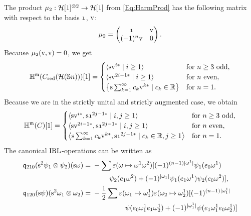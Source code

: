 \documentclass[\MainFolder/Text.tex]{subfiles}
\begin{document}
The product $\mu_2: \mathcal{H}[1]^{\otimes 2} \rightarrow \mathcal{H}[1]$ from \eqref{Eq:HarmProd} has the following matrix with respect to the basis $\NOne$, $\mathrm{v}$:
\begin{equation*} 
 \mu_2 = \begin{pmatrix} \NOne &  \NVol \\ (-1)^n \NVol & 0 \end{pmatrix}.
\end{equation*}
Because $\mu_2(\mathrm{v}, \mathrm{v}) = 0$, we get
\begin{equation*}
\mathbb{H}^{\mathfrak{m}}(C_{\mathrm{red}}(\mathcal{H}(\mathbb{S}{n})))[1] = \begin{cases}
                        \langle \mathrm{s} \mathrm{v}^{i*} \mid i \ge 1 \rangle & \text{for }n\ge 3\text{ odd}, \\
                        \langle  \mathrm{s} \mathrm{v}^{2i-1*} \mid i\ge 1 \rangle & \text{for }n\text{ even},\\
 \bigl\{ \mathrm{s}\sum_{k=1}^\infty c_k \mathrm{v}^{k*} \mid c_k\in \mathbb{R} \bigr\} & \text{for }n=1. 
\end{cases}
\end{equation*}
Because we are in the strictly unital and strictly augmented case, we obtain
\begin{equation} \label{Eq:HIBLSn}
\HIBL^\MC(\CycC)[1] = \begin{cases}
\langle \Susp \NVol^{i*}, \Susp \NOne^{2j-1*} \mid i, j \ge 1\rangle & \text{for }n\ge 3 \text{ odd}, \\
\langle \Susp \NVol^{2 i-1*}, \Susp \NOne^{2j-1*} \mid i, j \ge 1\rangle &\text{for }n\text{ even}, \\
 \bigl\langle \Susp\sum_{k=1}^\infty c_k \NVol^{k*}, \Susp \NOne^{2j-1*}\mid c_k\in \R, j \ge 1\bigr\rangle & \text{for }n=1. 
\end{cases}
\end{equation}
The canonical $\mathrm{IBL}$-operations can be written as
\begin{align*}
\OPQ_{210}(\Susp^2 \psi_1 \otimes \psi_2)(\Susp \omega) &= \begin{multlined}[t]-\sum \varepsilon(\omega\mapsto \omega^1 \omega^2)[(-1)^{(n-1)\Abs{\omega^1}} \psi_1(e_0 \omega^1) \\ \psi_2(e_1 \omega^2) + (-1)^{\Abs{\omega_1}}\psi_1(e_1 \omega^1) \psi_2(e_0 \omega^2)], \end{multlined} \\
\OPQ_{120}(\Susp \psi)(\Susp^2 \omega_1\otimes \omega_2) & = \begin{multlined}[t] - \frac{1}{2} \sum \varepsilon(\omega_1\mapsto \omega_{1}^{1}) \varepsilon(\omega_2\mapsto \omega_{2}^{1}) [(-1)^{(n-1)\Abs{\omega_{1}^{1}}} \\ \psi(e_0 \omega_{1}^{1} e_1 \omega_{2}^{1})  + (-1)^{\Abs{\omega_{1}^{1}}}\psi(e_1 \omega_{1}^{1} e_0 \omega_{2}^{1})] \end{multlined}
\end{align*}
\end{document}

